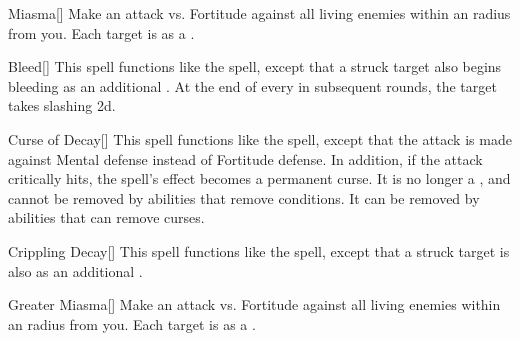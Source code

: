 \lowercase{\hypertarget{spell:Miasma}{}}\label{spell:Miasma}
\begin{freeability}[\nth{3}]{\hypertarget{spell:Miasma}{Miasma}}[]
Make an attack vs. Fortitude against all living enemies within an \areamed radius from you.
\hit Each target is  as a .
\end{freeability}
\vspace{0.25em}



\lowercase{\hypertarget{spell:Bleed}{}}\label{spell:Bleed}
\begin{freeability}[\nth{4}]{\hypertarget{spell:Bleed}{Bleed}}[]
This spell functions like the  spell, except that a struck target also begins bleeding as an additional .
At the end of every  in subsequent rounds, the target takes slashing  \minus2d.
\end{freeability}
\vspace{0.25em}



\lowercase{\hypertarget{spell:Curse of Decay}{}}\label{spell:Curse of Decay}
\begin{freeability}[\nth{4}]{\hypertarget{spell:Curse of Decay}{Curse of Decay}}[]
This spell functions like the  spell, except that the attack is made against Mental defense instead of Fortitude defense.
In addition, if the attack critically hits, the spell's effect becomes a permanent curse.
It is no longer a , and cannot be removed by abilities that remove conditions.
It can be removed by abilities that can remove curses.
\end{freeability}
\vspace{0.25em}



\lowercase{\hypertarget{spell:Crippling Decay}{}}\label{spell:Crippling Decay}
\begin{freeability}[\nth{5}]{\hypertarget{spell:Crippling Decay}{Crippling Decay}}[]
This spell functions like the  spell, except that a struck target is also  as an additional .
\end{freeability}
\vspace{0.25em}



\lowercase{\hypertarget{spell:Greater Miasma}{}}\label{spell:Greater Miasma}
\begin{freeability}[\nth{5}]{\hypertarget{spell:Greater Miasma}{Greater Miasma}}[]
Make an attack vs. Fortitude against all living enemies within an \areamed radius from you.
\hit Each target is  as a .
\end{freeability}
\vspace{0.25em}



